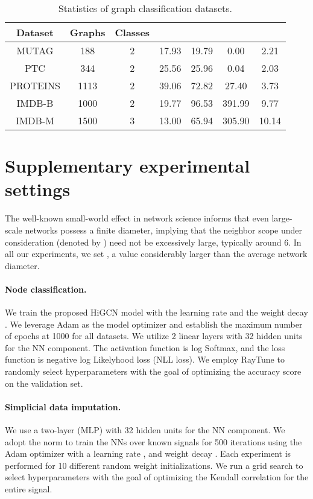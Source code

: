 \documentclass[letterpaper]{article} \usepackage{aaai24}
\theoremstyle{plain}
\theoremstyle{definition}
\theoremstyle{remark}
\begin{document}
\begin{table*}[htbp]
\centering
\begin{tabular}{ccccccc}
\toprule
Dataset   
& Graphs
& Classes   
&  
&  
&  
&  \\  \midrule
MUTAG       & 188   & 2     & 17.93     & 19.79     & 0.00     &2.21\\
PTC         & 344   & 2     & 25.56     & 25.96     & 0.04  &2.03\\
PROTEINS    & 1113  & 2     & 39.06     & 72.82     & 27.40  & 3.73        \\
IMDB-B      & 1000  & 2     & 19.77     & 96.53     & 391.99 & 9.77\\
IMDB-M      & 1500  & 3     & 13.00     & 65.94     & 305.90 & 10.14\\
\bottomrule
\end{tabular}
\caption{Statistics of graph classification datasets.}
\label{tab:graph_datasets}
\end{table*}


\section{Supplementary experimental settings}
\label{appendix: exp_setting}


The well-known small-world effect \cite{SmallWorld1967} in network science informs that even large-scale networks possess a finite diameter, implying that the neighbor scope under consideration (denoted by ) need not be excessively large, typically around 6. In all our experiments, we set , a value considerably larger than the average network diameter.


\paragraph{Node classification.}
We train the proposed HiGCN model with the learning rate  and the weight decay .
We leverage Adam as the model optimizer and establish the maximum number of epochs at 1000 for all datasets. 
We utilize 2 linear layers with 32 hidden units for the NN component. 
The activation function is log Softmax, and the loss function is negative log Likelyhood loss (NLL loss). 
We employ RayTune to randomly select hyperparameters with the goal of optimizing the accuracy score on the validation set.

\paragraph{Simplicial data imputation.} 
We use a two-layer (MLP) with 32 hidden units for the NN component.
We adopt the  norm to train the NNs over known signals for 500 iterations using the Adam optimizer with a learning rate  ,  and weight decay . Each experiment is performed for 10 different random weight initializations.
We run a grid search to select hyperparameters with the goal of optimizing the Kendall correlation for the entire signal.
\end{document}
